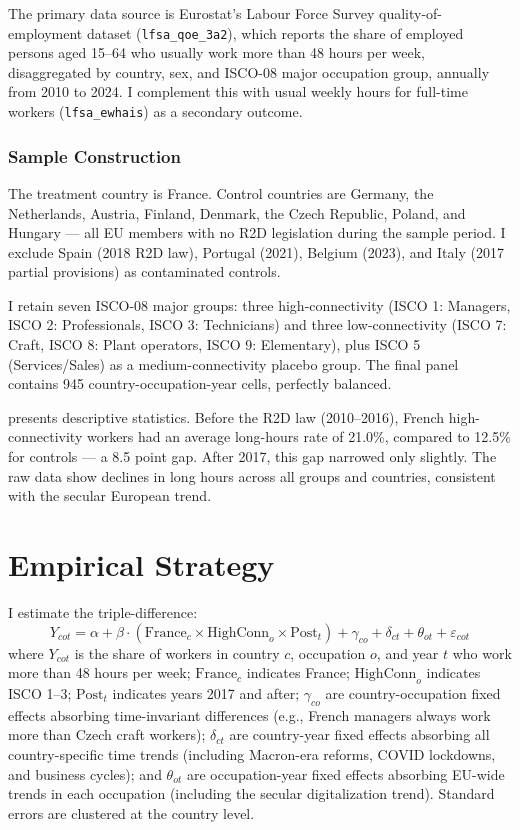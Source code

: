 \documentclass[12pt]{article}
\begin{document}
The primary data source is Eurostat's Labour Force Survey quality-of-employment dataset (\texttt{lfsa\_qoe\_3a2}), which reports the share of employed persons aged 15--64 who usually work more than 48 hours per week, disaggregated by country, sex, and ISCO-08 major occupation group, annually from 2010 to 2024. I complement this with usual weekly hours for full-time workers (\texttt{lfsa\_ewhais}) as a secondary outcome.

\subsubsection*{Sample Construction} The treatment country is France. Control countries are Germany, the Netherlands, Austria, Finland, Denmark, the Czech Republic, Poland, and Hungary --- all EU members with no R2D legislation during the sample period. I exclude Spain (2018 R2D law), Portugal (2021), Belgium (2023), and Italy (2017 partial provisions) as contaminated controls.

I retain seven ISCO-08 major groups: three high-connectivity (ISCO 1: Managers, ISCO 2: Professionals, ISCO 3: Technicians) and three low-connectivity (ISCO 7: Craft, ISCO 8: Plant operators, ISCO 9: Elementary), plus ISCO 5 (Services/Sales) as a medium-connectivity placebo group. The final panel contains 945 country-occupation-year cells, perfectly balanced.



 presents descriptive statistics. Before the R2D law (2010--2016), French high-connectivity workers had an average long-hours rate of 21.0\%, compared to 12.5\% for controls --- a 8.5 point gap. After 2017, this gap narrowed only slightly. The raw data show declines in long hours across all groups and countries, consistent with the secular European trend.


\section{Empirical Strategy}

I estimate the triple-difference:
\begin{equation}
Y_{cot} = \alpha + \beta \cdot (\text{France}_c \times \text{HighConn}_o \times \text{Post}_t) + \gamma_{co} + \delta_{ct} + \theta_{ot} + \varepsilon_{cot}
\label{eq:ddd}
\end{equation}
where $Y_{cot}$ is the share of workers in country $c$, occupation $o$, and year $t$ who work more than 48 hours per week; $\text{France}_c$ indicates France; $\text{HighConn}_o$ indicates ISCO 1--3; $\text{Post}_t$ indicates years 2017 and after; $\gamma_{co}$ are country-occupation fixed effects absorbing time-invariant differences (e.g., French managers always work more than Czech craft workers); $\delta_{ct}$ are country-year fixed effects absorbing all country-specific time trends (including Macron-era reforms, COVID lockdowns, and business cycles); and $\theta_{ot}$ are occupation-year fixed effects absorbing EU-wide trends in each occupation (including the secular digitalization trend). Standard errors are clustered at the country level.
\end{document}
